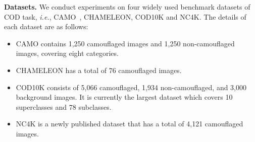 \documentclass{ecai}
\begin{document}
\noindent\textbf{Datasets.} 
We conduct experiments on four widely used benchmark datasets of COD task, \textit{i.e.}, CAMO~, CHAMELEON, COD10K and NC4K. The details of each dataset
are as follows: 
\begin{itemize}
    \item CAMO contains 1,250 camouflaged images and 1,250 non-camouflaged images, covering eight categories.
    \item CHAMELEON has a total of 76 camouflaged images. 
    \item COD10K consists of 5,066 camouflaged, 1,934 non-camouflaged, and 3,000 background images. It is currently the largest dataset which covers 10 superclasses and 78 subclasses.
    \item NC4K is a newly published dataset that has a total of 4,121 camouflaged images.
\end{itemize}

\end{document}
